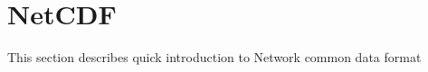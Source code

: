 \chapter{NetCDF}
\label{app:netcdf}
This section describes quick introduction to Network common data format
